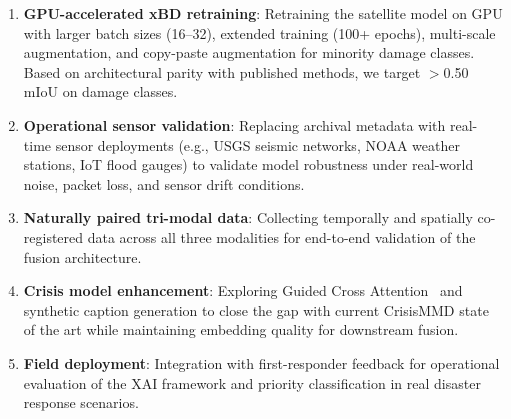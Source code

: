 \documentclass[journal]{IEEEtran}
\begin{document}
\begin{enumerate}
    \item \textbf{GPU-accelerated xBD retraining}: Retraining the satellite model on GPU with larger batch sizes (16--32), extended training (100+ epochs), multi-scale augmentation, and copy-paste augmentation for minority damage classes. Based on architectural parity with published methods, we target $>$0.50 mIoU on damage classes.
    \item \textbf{Operational sensor validation}: Replacing archival metadata with real-time sensor deployments (e.g., USGS seismic networks, NOAA weather stations, IoT flood gauges) to validate model robustness under real-world noise, packet loss, and sensor drift conditions.
    \item \textbf{Naturally paired tri-modal data}: Collecting temporally and spatially co-registered data across all three modalities for end-to-end validation of the fusion architecture.
    \item \textbf{Crisis model enhancement}: Exploring Guided Cross Attention~\cite{mouzannar2025guidedcross} and synthetic caption generation to close the gap with current CrisisMMD state of the art while maintaining embedding quality for downstream fusion.
    \item \textbf{Field deployment}: Integration with first-responder feedback for operational evaluation of the XAI framework and priority classification in real disaster response scenarios.
\end{enumerate}
\end{document}
